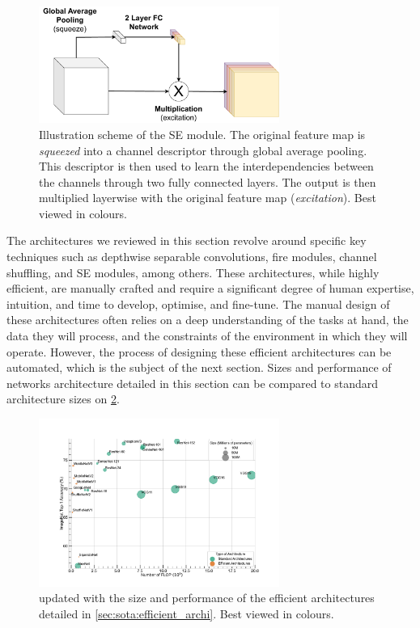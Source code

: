 
\begin{figure}[htbp]
  \centering
  \includegraphics[width=0.70\textwidth]{chapter_sota/assets/SE_module.pdf}
  \caption{Illustration scheme of the \acf{SE} module. The original feature
    map is \emph{squeezed} into a channel descriptor through global average
    pooling. This descriptor is then used to learn the interdependencies between
    the channels through two fully connected layers. The output is then
    multiplied layerwise with the original feature map (\emph{excitation}). Best
    viewed in colours.}
  \label{fig:sota:se_module}
\end{figure}


The architectures we reviewed in this section revolve around specific key
techniques such as depthwise separable convolutions, fire modules, channel
shuffling, and \ac{SE} modules, among others. These architectures, while highly
efficient, are manually crafted and require a significant degree of human
expertise, intuition, and time to develop, optimise, and fine-tune. The manual
design of these architectures often relies on a deep understanding of the tasks
at hand, the data they will process, and the constraints of the environment in
which they will operate. However, the process of designing these efficient
architectures can be automated, which is the subject of the next section. Sizes
and performance of networks architecture detailed in this section can be
compared to standard architecture sizes on \cref{fig:sota:net_sizes_std_eff}.\\

\begin{figure}[htbp]
  \centering
  \includegraphics[width=0.70\textwidth]{chapter_sota/assets/network_sizes_normal_eff.pdf}
  \caption{ updated with the size and performance of the
    efficient architectures detailed in \cref{sec:sota:efficient_archi}. Best
    viewed in colours.}
  \label{fig:sota:net_sizes_std_eff}
\end{figure}




